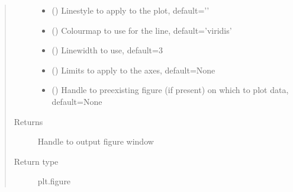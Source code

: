 \documentclass[letterpaper,10pt,english]{sphinxmanual}
\begin{document}
\begin{fulllineitems}
\begin{quote}
\begin{description}
\begin{itemize}
\item {} 
\sphinxAtStartPar
{} (\sphinxstyleliteralemphasis{\sphinxupquote{, }}) \textendash{} Linestyle to apply to the plot, default=’\sphinxhyphen{}’

\item {} 
\sphinxAtStartPar
{} (\sphinxstyleliteralemphasis{\sphinxupquote{, }}) \textendash{} Colourmap to use for the line, default=’viridis’

\item {} 
\sphinxAtStartPar
{} (\sphinxstyleliteralemphasis{\sphinxupquote{, }}) \textendash{} Linewidth to use, default=3

\item {} 
\sphinxAtStartPar
{} (\sphinxstyleliteralemphasis{\sphinxupquote{, }}) \textendash{} Limits to apply to the axes, default=None

\item {} 
\sphinxAtStartPar
{} (\sphinxstyleliteralemphasis{\sphinxupquote{, }}) \textendash{} Handle to pre\sphinxhyphen{}existing figure (if present) on which to plot data, default=None

\end{itemize}

\item[{Returns}] \leavevmode
\sphinxAtStartPar
{} \textendash{} Handle to output figure window

\item[{Return type}] \leavevmode
\sphinxAtStartPar
plt.figure

\end{description}\end{quote}

\end{fulllineitems}
\end{document}
